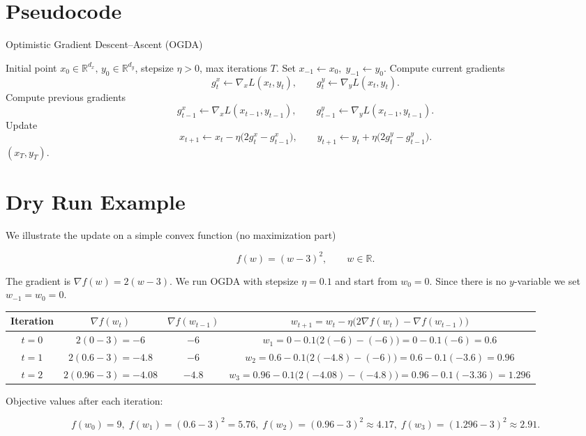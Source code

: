 \documentclass{article}
\begin{document}
\section*{Pseudocode}
\begin{algorithm}[H]
\caption{Optimistic Gradient Descent–Ascent (OGDA)}
\begin{algorithmic}[1]
\REQUIRE Initial point \(x_0\in\mathbb{R}^{d_x},\,y_0\in\mathbb{R}^{d_y}\), stepsize \(\eta>0\), max iterations \(T\).
\STATE Set \(x_{-1}\gets x_0,\;y_{-1}\gets y_0\).
    \STATE Compute current gradients 
    \[
    g^x_t\gets\nabla_x L(x_t,y_t),\qquad 
    g^y_t\gets\nabla_y L(x_t,y_t).
    \]
    \STATE Compute previous gradients 
    \[
    g^x_{t-1}\gets\nabla_x L(x_{t-1},y_{t-1}),\qquad 
    g^y_{t-1}\gets\nabla_y L(x_{t-1},y_{t-1}).
    \]
    \STATE Update
    \[
    x_{t+1}\gets x_t-\eta\big(2g^x_t-g^x_{t-1}\big),\qquad
    y_{t+1}\gets y_t+\eta\big(2g^y_t-g^y_{t-1}\big).
    \]
\ENDFOR
\RETURN \((x_T,y_T)\).
\end{algorithmic}
\end{algorithm}

\section*{Dry Run Example}
We illustrate the update on a simple convex function (no maximization part)  

\[
f(w)=(w-3)^2,\qquad w\in\mathbb{R}.
\]

The gradient is \(\nabla f(w)=2(w-3)\).  We run OGDA with stepsize \(\eta=0.1\) and start from \(w_{0}=0\).  
Since there is no \(y\)-variable we set \(w_{-1}=w_{0}=0\).

\begin{tabular}{c|c|c|c}
\textbf{Iteration} & \(\nabla f(w_t)\) & \(\nabla f(w_{t-1})\) & \(w_{t+1}=w_t-\eta\big(2\nabla f(w_t)-\nabla f(w_{t-1})\big)\)\\ \hline
\(t=0\) & \(2(0-3)=-6\) & \(-6\) & \(w_{1}=0-0.1\big(2(-6)-(-6)\big)=0-0.1(-6)=0.6\)\\[2mm]
\(t=1\) & \(2(0.6-3)=-4.8\) & \(-6\) & \(w_{2}=0.6-0.1\big(2(-4.8)-(-6)\big)=0.6-0.1(-3.6)=0.96\)\\[2mm]
\(t=2\) & \(2(0.96-3)=-4.08\) & \(-4.8\) & \(w_{3}=0.96-0.1\big(2(-4.08)-(-4.8)\big)=0.96-0.1(-3.36)=1.296\)
\end{tabular}

Objective values after each iteration:

\[
f(w_0)=9,\; f(w_1)=(0.6-3)^2=5.76,\;
f(w_2)=(0.96-3)^2\approx4.17,\;
f(w_3)=(1.296-3)^2\approx2.91.
\]
\end{document}

